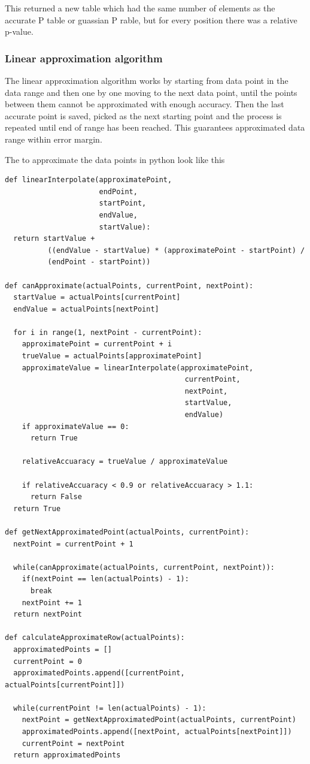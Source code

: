 \documentclass[12pt]{article}
\begin{document}
This returned a new table which had the same number of elements as the accurate P table or guassian P rable, but for every position there was a relative p-value.

\subsubsection{Linear approximation algorithm}

The linear approximation algorithm works by starting from data point in the data range and then one by one moving to the next data point, until the points between them cannot be approximated with enough accuracy. Then the last accurate point is saved, picked as the next starting point and the process is repeated until end of range has been reached. This guarantees approximated data range within error margin.

The to approximate the data points in python look like this
\newpage
\begin{verbatim}
def linearInterpolate(approximatePoint,
                      endPoint,
                      startPoint,
                      endValue,
                      startValue):
  return startValue +
          ((endValue - startValue) * (approximatePoint - startPoint) /
          (endPoint - startPoint))

def canApproximate(actualPoints, currentPoint, nextPoint):
  startValue = actualPoints[currentPoint]
  endValue = actualPoints[nextPoint]

  for i in range(1, nextPoint - currentPoint):
    approximatePoint = currentPoint + i
    trueValue = actualPoints[approximatePoint]
    approximateValue = linearInterpolate(approximatePoint,
                                          currentPoint,
                                          nextPoint,
                                          startValue,
                                          endValue)
    if approximateValue == 0:
      return True

    relativeAccuaracy = trueValue / approximateValue

    if relativeAccuaracy < 0.9 or relativeAccuaracy > 1.1:
      return False
  return True

def getNextApproximatedPoint(actualPoints, currentPoint):
  nextPoint = currentPoint + 1

  while(canApproximate(actualPoints, currentPoint, nextPoint)):
    if(nextPoint == len(actualPoints) - 1):
      break
    nextPoint += 1
  return nextPoint

def calculateApproximateRow(actualPoints):
  approximatedPoints = []
  currentPoint = 0
  approximatedPoints.append([currentPoint, actualPoints[currentPoint]])

  while(currentPoint != len(actualPoints) - 1):
    nextPoint = getNextApproximatedPoint(actualPoints, currentPoint)
    approximatedPoints.append([nextPoint, actualPoints[nextPoint]])
    currentPoint = nextPoint
  return approximatedPoints

\end{verbatim}
\end{document}
